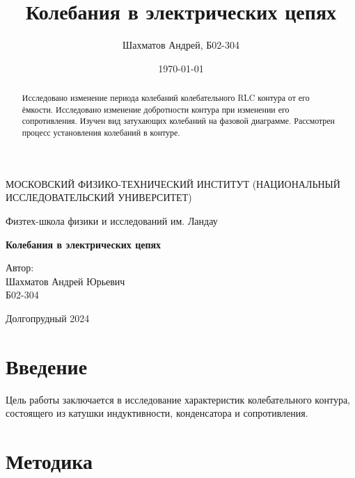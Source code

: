 \documentclass[12pt]{article}
\title{Колебания в электрических цепях}
\author{Шахматов Андрей, Б02-304}
\date{\today}
\begin{document}
\begin{titlepage}
	\begin{center}
		{\large МОСКОВСКИЙ ФИЗИКО-ТЕХНИЧЕСКИЙ ИНСТИТУТ (НАЦИОНАЛЬНЫЙ ИССЛЕДОВАТЕЛЬСКИЙ УНИВЕРСИТЕТ)}
	\end{center}
	\begin{center}
		{\large Физтех-школа физики и исследований им. Ландау}
	\end{center}

	\vspace{3cm}
	{\huge
		\begin{center}
			\textbf{Колебания в электрических цепях}
		\end{center}
	}
	\vspace{2cm}
	\begin{flushright}
		{\LARGE Автор:\\ Шахматов Андрей Юрьевич \\
			\vspace{0.2cm}
			Б02-304}
	\end{flushright}
	\vspace{7 cm}
	\begin{center}
		Долгопрудный 2024
	\end{center}
	\thispagestyle{empty}
\end{titlepage}


\begin{abstract}
	Исследовано изменение периода колебаний колебательного RLC контура от его ёмкости. Исследовано 
	изменение добротности контура при изменении его сопротивления. Изучен вид затухающих колебаний на фазовой 
	диаграмме. Рассмотрен процесс установления колебаний в контуре. 
\end{abstract}


\section*{Введение}
Цель работы заключается в исследование характеристик колебательного контура, состоящего из катушки индуктивности, конденсатора и 
сопротивления.

\section*{Методика}
\end{document}

